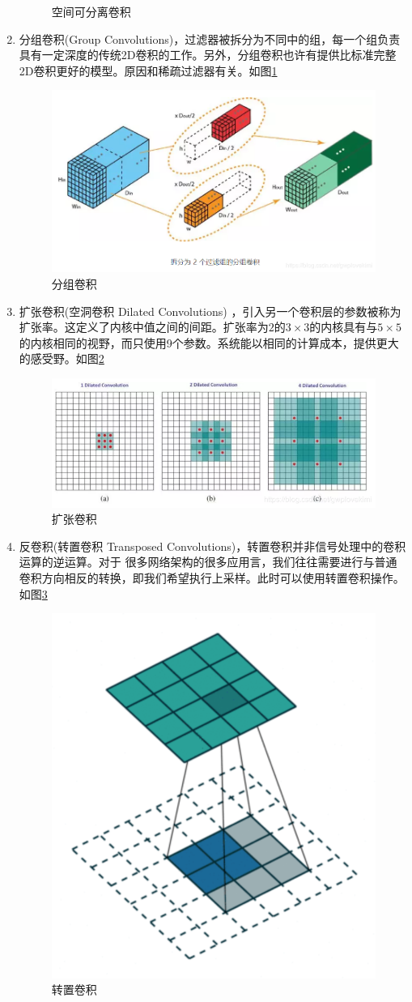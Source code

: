 \begin{enumerate}
\begin{figure}[H]
		\caption{空间可分离卷积}
	\end{figure}
	\item 分组卷积(Group Convolutions)，过滤器被拆分为不同中的组，每一个组负责具有一定深度的传统2D卷积的工作。另外，分组卷积也许有提供比标准完整2D卷积更好的模型。原因和稀疏过滤器有关。如图\ref{g_conv}
	\begin{figure}[H]
		\label{g_conv}
		\centering
		\includegraphics[width=0.5\linewidth]{./img/code/CNN/9}
		\caption{分组卷积}
	\end{figure}
	\item 扩张卷积(空洞卷积 Dilated Convolutions) ，引入另一个卷积层的参数被称为扩张率。这定义了内核中值之间的间距。扩张率为$2$的$3\times 3$的内核具有与$5\times 5$的内核相同的视野，而只使用9个参数。系统能以相同的计算成本，提供更大的感受野。如图\ref{d_conv}
	\begin{figure}[H]
		\label{d_conv}
		\centering
		\includegraphics[width=0.5\linewidth]{./img/code/CNN/10}
		\caption{扩张卷积}
	\end{figure}
	\item 反卷积(转置卷积 Transposed Convolutions)，转置卷积并非信号处理中的卷积运算的逆运算。对于 很多网络架构的很多应用言，我们往往需要进行与普通卷积方向相反的转换，即我们希望执行上采样。此时可以使用转置卷积操作。如图\ref{t_conv}
	\begin{figure}[H]
		\label{t_conv}
		\centering
		\includegraphics[width=0.3\linewidth]{./img/code/CNN/11.png}
		\caption{转置卷积}
	\end{figure}
\end{enumerate}
